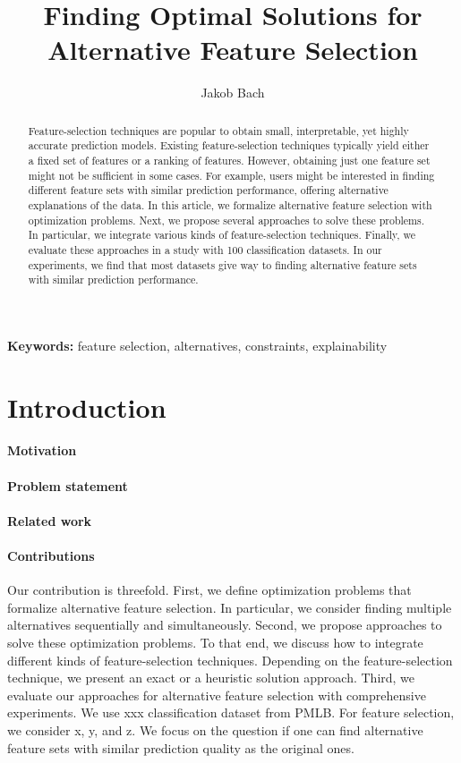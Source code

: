\documentclass{article}
\title{Finding Optimal Solutions for Alternative Feature Selection}
\author{Jakob Bach}
\theoremstyle{definition}
\begin{document}
\maketitle

\begin{abstract}
Feature-selection techniques are popular to obtain small, interpretable, yet highly accurate prediction models.
Existing feature-selection techniques typically yield either a fixed set of features or a ranking of features.
However, obtaining just one feature set might not be sufficient in some cases.
For example, users might be interested in finding different feature sets with similar prediction performance, offering alternative explanations of the data.
In this article, we formalize alternative feature selection with optimization problems.
Next, we propose several approaches to solve these problems.
In particular, we integrate various kinds of feature-selection techniques.
Finally, we evaluate these approaches in a study with 100 classification datasets.
In our experiments, we find that most datasets give way to finding alternative feature sets with similar prediction performance.
\end{abstract}

\textbf{Keywords:} feature selection, alternatives, constraints, explainability

\section{Introduction}
\label{sec:introduction}

\paragraph{Motivation}

\paragraph{Problem statement}

\paragraph{Related work}

\paragraph{Contributions}

Our contribution is threefold.
First, we define optimization problems that formalize alternative feature selection.
In particular, we consider finding multiple alternatives sequentially and simultaneously.
Second, we propose approaches to solve these optimization problems.
To that end, we discuss how to integrate different kinds of feature-selection techniques.
Depending on the feature-selection technique, we present an exact or a heuristic solution approach.
Third, we evaluate our approaches for alternative feature selection with comprehensive experiments.
We use xxx classification dataset from PMLB\cite{olson2017pmlb, romano2021pmlb}.
For feature selection, we consider x, y, and z.
We focus on the question if one can find alternative feature sets with similar prediction quality as the original ones.
\end{document}
